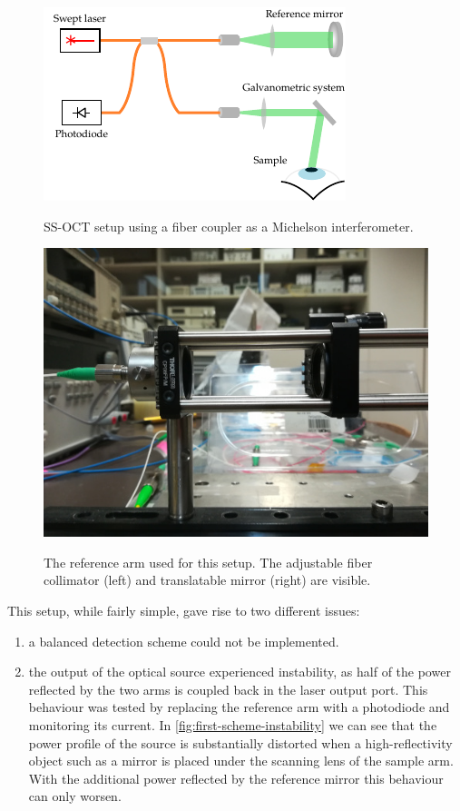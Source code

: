 \begin{figure}[bth]
	\myfloatalign
	{\includegraphics[width=0.8\linewidth]{gfx/setup-diagrams/basic-oct.pdf}}
	\caption{SS-OCT setup using a fiber coupler as a Michelson interferometer.}\label{fig:basic-oct}
\end{figure}


\begin{figure}[bth]
	\myfloatalign
	{\includegraphics[width=0.6\linewidth]{gfx/ch3/reference-arm-photo}}
	\caption{The reference arm used for this setup. The adjustable fiber collimator (left) and translatable mirror (right) are visible.}\label{fig:reference-arm-photo}
\end{figure}

This setup, while fairly simple, gave rise to two different issues:
\begin{enumerate}
	\item a balanced detection scheme could not be implemented.
	
	\item the output of the optical source experienced instability, as half of the power reflected by the two arms is coupled back in the laser output port. This behaviour was tested by replacing the reference arm with a photodiode and monitoring its current. In \autoref{fig:first-scheme-instability} we can see that the power profile of the source is substantially distorted when a high-reflectivity object such as a mirror is placed under the scanning lens of the sample arm. With the additional power reflected by the reference mirror this behaviour can only worsen. 	
\end{enumerate}


